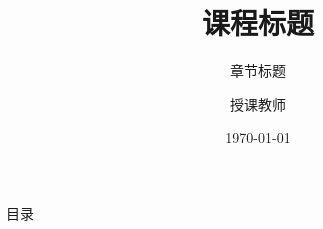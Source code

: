 \documentclass[aspectratio=169,11pt]{ctexbeamer}
\title{课程标题}
\subtitle{章节标题}
\author{授课教师}
\institute{单位}
\date{\today}
\begin{document}
\begin{frame}
  \titlepage
\end{frame}

\begin{frame}{目录}
  \tableofcontents
\end{frame}

\end{document}
